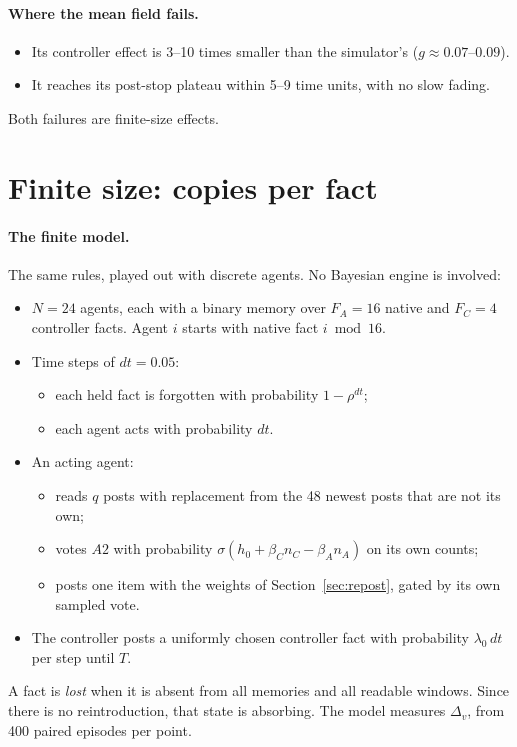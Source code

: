 \documentclass[10pt,a4paper]{article}
\theoremstyle{definition}
\begin{document}
\paragraph{Where the mean field fails.}
\begin{itemize}
\item Its controller effect is 3--10 times smaller than the simulator's ($g\approx0.07$--$0.09$).
\item It reaches its post-stop plateau within 5--9 time units, with no slow fading.
\end{itemize}
Both failures are finite-size effects.

\section{Finite size: copies per fact}
\label{sec:finite}
\paragraph{The finite model.} The same rules, played out with discrete agents. No Bayesian engine is involved:
\begin{itemize}
\item $N=24$ agents, each with a binary memory over $F_A=16$ native and $F_C=4$ controller facts. Agent $i$ starts with
  native fact $i \bmod 16$.
\item Time steps of $dt=0.05$:
  \begin{itemize}
  \item each held fact is forgotten with probability $1-\rho^{dt}$;
  \item each agent acts with probability $dt$.
  \end{itemize}
\item An acting agent:
  \begin{itemize}
  \item reads $q$ posts with replacement from the 48 newest posts that are not its own;
  \item votes $A2$ with probability $\sigma(h_0+\beta_C n_C-\beta_A n_A)$ on its own counts;
  \item posts one item with the weights of Section~\ref{sec:repost}, gated by its own sampled vote.
  \end{itemize}
\item The controller posts a uniformly chosen controller fact with probability $\lambda_0\,dt$ per step until $T$.
\end{itemize}
A fact is \emph{lost} when it is absent from all memories and all readable windows. Since there is no reintroduction,
that state is absorbing. The model measures $\Delta_v$, from 400 paired episodes per point.
\end{document}
